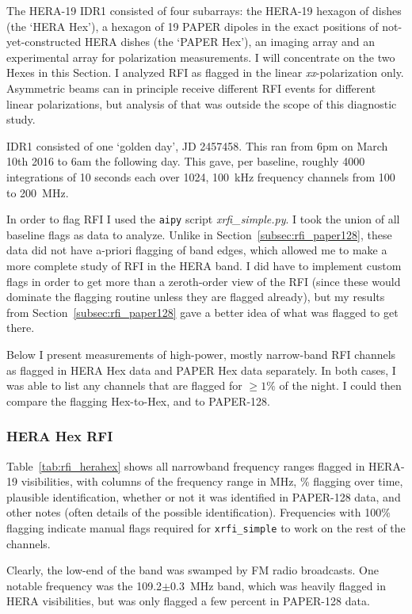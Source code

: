 The HERA-19 IDR1 consisted of four subarrays: the HERA-19 hexagon of dishes (the `HERA Hex'), a hexagon of 19 PAPER dipoles in the exact positions of not-yet-constructed HERA dishes (the `PAPER Hex'), an imaging array and an experimental array for polarization measurements. I will concentrate on the two Hexes in this Section. I analyzed RFI as flagged in the linear \textit{xx}-polarization only. Asymmetric beams can in principle receive different RFI events for different linear polarizations, but analysis of that was outside the scope of this diagnostic study.

IDR1 consisted of one `golden day', JD 2457458. This ran from 6pm on March 10th 2016 to 6am the following day. This gave, per baseline, roughly 4000 integrations of 10 seconds each over 1024, 100~kHz frequency channels from 100 to 200~MHz.

In order to flag RFI I used the {\tt aipy} script \textit{xrfi\_simple.py}. I took the union of all baseline flags as data to analyze. Unlike in Section~\ref{subsec:rfi_paper128}, these data did not have a-priori flagging of band edges, which allowed me to make a more complete study of RFI in the HERA band. I did have to implement custom flags in order to get more than a zeroth-order view of the RFI (since these would dominate the flagging routine unless they are flagged already), but my results from Section~\ref{subsec:rfi_paper128}  gave a better idea of what was flagged to get there. 

Below I present measurements of high-power, mostly narrow-band RFI channels as flagged in HERA Hex data and PAPER Hex data separately. In both cases, I was able to list any channels that are flagged for $\geqslant 1\%$ of the night. I could then compare the flagging Hex-to-Hex, and to PAPER-128.

\subsubsection{HERA Hex RFI}
\label{subsubsec:rfi_herahex}

Table~\ref{tab:rfi_herahex} shows all narrowband frequency ranges flagged in HERA-19 visibilities, with columns of the frequency range in MHz, \% flagging over time, plausible identification, whether or not it was identified in PAPER-128 data, and other notes (often details of the possible identification). Frequencies with 100\% flagging indicate manual flags required for {\tt xrfi\_simple} to work on the rest of the channels. 

Clearly, the low-end of the band was swamped by FM radio broadcasts. One notable frequency was the 109.2$\pm$0.3~MHz band, which was heavily flagged in HERA visibilities, but was only flagged a few percent in PAPER-128 data.

